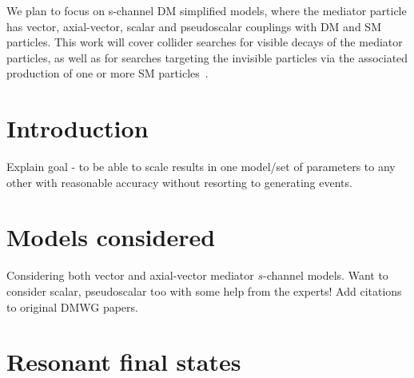 \documentclass[a4paper, 11pt,notoc]{article}
\begin{document}
{We plan to focus on s-channel DM simplified models, where the mediator particle has vector, axial-vector, scalar and pseudoscalar couplings with DM and SM particles. This work will cover collider searches for visible decays of the mediator particles, as well as for searches targeting the invisible particles via the associated production of one or more SM particles~\cite{ATL-PHYS-PUB-2020-021,CMSSummary}.
}  

\maketitle



\vskip10pt


%
%




\section{Introduction}
\label{sec:introduction}

Explain goal - to be able to scale results in one model/set of parameters to any other with reasonable accuracy without resorting to generating events.


\section{Models considered}
\label{sec:models}

Considering both vector and axial-vector mediator $s$-channel models. Want to consider scalar, pseudoscalar too with some help from the experts! Add citations to original DMWG papers.


\section{Resonant final states}
\label{sec:resonant}
\end{document}
